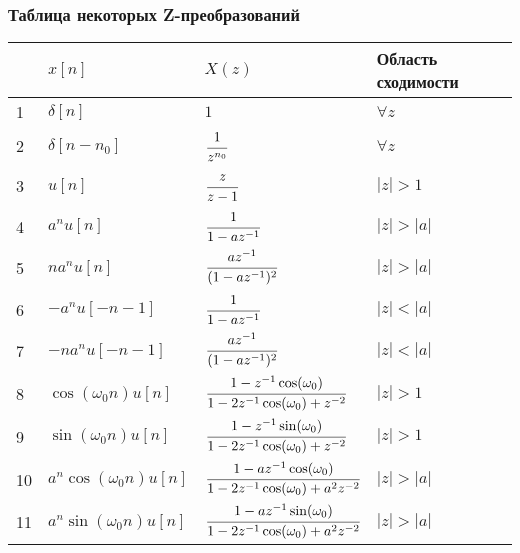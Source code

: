 \documentclass[12pt, a6paper]{extarticle}
\begin{document}
\subsubsection{Таблица некоторых Z-преобразований}
\begin{tabular}[c]{|p{0.3cm}|p{4.5cm}|p{4.5cm}|p{6cm}|}\hline
 & $x[n]$ & $X(z)$ & Область сходимости \\ \hline
1 & $ \delta[n] $ & $1$ & $ \forall z $ \\ \hline
2 & $ \delta[n-n_0]$ & $ \cfrac{1}{z^{n_0}} $ & $ \forall z $ \\ \hline
3 & $ u[n]$ & $\cfrac{z}{z-1} $ & $ |z|>1 $ \\ \hline
4 & $ a^n u[n]$ & $ \cfrac{1}{1-az^{-1}} $ & $ |z|>|a| $ \\ \hline
5 & $ n a^n u[n]$ & $ \cfrac{az^{-1}}{(1-az^{-1})^2} $ & $ |z|>|a| $ \\ \hline
6 & $ -a^n u[-n-1]$ & $ \cfrac{1}{1-az^{-1}} $ & $ |z|<|a| $ \\ \hline
7 & $ -n a^n u[-n-1]$ & $ \cfrac{az^{-1}}{(1-az^{-1})^2} $ & $ |z|<|a| $ \\ \hline
8 & $ \cos(\omega_0 n) u[n]$ & $ \cfrac{1-z^{-1}\cos(\omega_0)}{1-2z^{-1}\cos(\omega_0)+z^{-2}} $ & $ |z|>1 $ \\ \hline
9 & $ \sin(\omega_0 n) u[n]$ & $ \cfrac{1-z^{-1}\sin(\omega_0)}{1-2z^{-1}\cos(\omega_0)+z^{-2}}$ & $ |z|>1 $ \\ \hline
10 & $ a^n \cos(\omega_0 n) u[n]$ & $ \cfrac{1-az^{-1}\cos(\omega_0)}{1-2z^{-1}\cos(\omega_0)+a^2z^{-2}}$ & $ |z|>|a| $ \\ \hline
11 & $ a^n \sin(\omega_0 n) u[n]$ & $ \cfrac{1-az^{-1}\sin(\omega_0)}{1-2z^{-1}\cos(\omega_0)+a^2z^{-2}}$ & $ |z|>|a| $ \\ \hline
\end{tabular}
\end{document}
